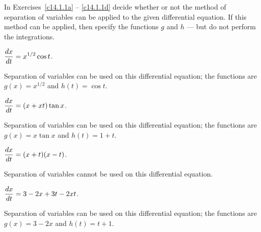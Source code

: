 \documentclass{ximera}
\begin{document}
\noindent In Exercises~\ref{c14.1.1a} -- \ref{c14.1.1d} decide whether 
or not the method of separation of variables can be applied to the given
differential equation.  If this method can be applied, then specify the 
functions $g$ and $h$ --- but do not perform the integrations.
\begin{exercise} \label{c14.1.1a}
$\displaystyle \frac{dx}{dt} = x^{1/2}\cos t$.

\begin{solution}
\ans Separation of variables can be used on this differential
equation; the functions are $g(x) = x^{1/2}$ and $h(t) = \cos t$.

\end{solution}
\end{exercise}
\begin{exercise} \label{c14.1.1b}
$\displaystyle \frac{dx}{dt} = (x+xt)\tan x$.

\begin{solution}
\ans Separation of variables can be used on this differential
equation; the functions are $g(x) = x\tan x$ and $h(t) = 1 + t$.

\end{solution}
\end{exercise}
\begin{exercise} \label{c14.1.1c}
$\displaystyle \frac{dx}{dt} = (x+t)(x-t)$.

\begin{solution}
\ans Separation of variables cannot be used on this
differential equation.

\end{solution}
\end{exercise}
\begin{exercise} \label{c14.1.1d}
$\displaystyle \frac{dx}{dt} = 3-2x+3t-2xt$.

\begin{solution}
\ans Separation of variables can be used on this differential
equation; the functions are $g(x) = 3 - 2x$ and $h(t) = t + 1$.

\end{solution}
\end{exercise}
\end{document}
